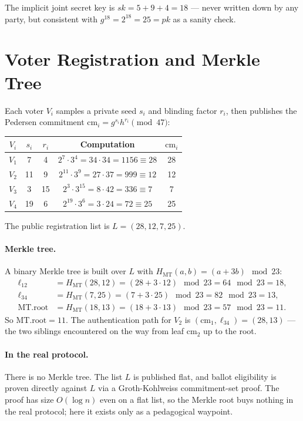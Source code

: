 \documentclass[12pt,a4paper,oneside]{report}
\begin{document}
The implicit joint secret key is $sk = 5 + 9 + 4 = 18$ --- never written 
down by any party, but consistent with $g^{18} = 2^{18} = 25 = pk$ as a 
sanity check.

\section{Voter Registration and Merkle Tree}
\label{sec:byhand-registration}

Each voter $V_i$ samples a private seed $s_i$ and blinding factor $r_i$, 
then publishes the Pedersen commitment $\text{cm}_i = g^{s_i} h^{r_i} \pmod{47}$:

\begin{table}[H]
\centering
\small
\begin{tabular}{ccccc}
\toprule
$V_i$ & $s_i$ & $r_i$ & Computation & $\text{cm}_i$ \\
\midrule
$V_1$ & 7 & 4 & $2^7 \cdot 3^4 = 34 \cdot 34 = 1156 \equiv 28$ & 28 \\
$V_2$ & 11 & 9 & $2^{11} \cdot 3^9 = 27 \cdot 37 = 999 \equiv 12$ & 12 \\
$V_3$ & 3 & 15 & $2^3 \cdot 3^{15} = 8 \cdot 42 = 336 \equiv 7$ & 7 \\
$V_4$ & 19 & 6 & $2^{19} \cdot 3^6 = 3 \cdot 24 = 72 \equiv 25$ & 25 \\
\bottomrule
\end{tabular}
\end{table}

The public registration list is $L = (28, 12, 7, 25)$.

\paragraph{Merkle tree.}
A binary Merkle tree is built over $L$ with $H_{\text{MT}}(a, b) = (a + 3b) \mod 23$:
\begin{align*}
    \ell_{12} &= H_{\text{MT}}(28, 12) = (28 + 3 \cdot 12) \mod 23 = 64 \mod 23 = 18, \\
    \ell_{34} &= H_{\text{MT}}(7, 25) = (7 + 3 \cdot 25) \mod 23 = 82 \mod 23 = 13, \\
    \text{MT.root} &= H_{\text{MT}}(18, 13) = (18 + 3 \cdot 13) \mod 23 = 57 \mod 23 = 11.
\end{align*}
So $\text{MT.root} = 11$. The authentication path for $V_2$ is 
$(\text{cm}_1, \ell_{34}) = (28, 13)$ --- the two siblings encountered 
on the way from leaf $\text{cm}_2$ up to the root.

\paragraph{In the real protocol.} 
There is no Merkle tree. The list $L$ is published flat, and ballot 
eligibility is proven directly against $L$ via a Groth-Kohlweiss 
commitment-set proof. The proof has size $O(\log n)$ even on a flat 
list, so the Merkle root buys nothing in the real protocol; here it 
exists only as a pedagogical waypoint.
\end{document}
